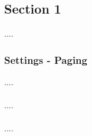 \subsection{Section 1}

\begin{flushleft}
    ....
\end{flushleft}

\subsubsection{Settings - Paging}

\begin{flushleft}
    ....\\~\\

    ....\\~\\
    
    ....\\~\\
\end{flushleft}